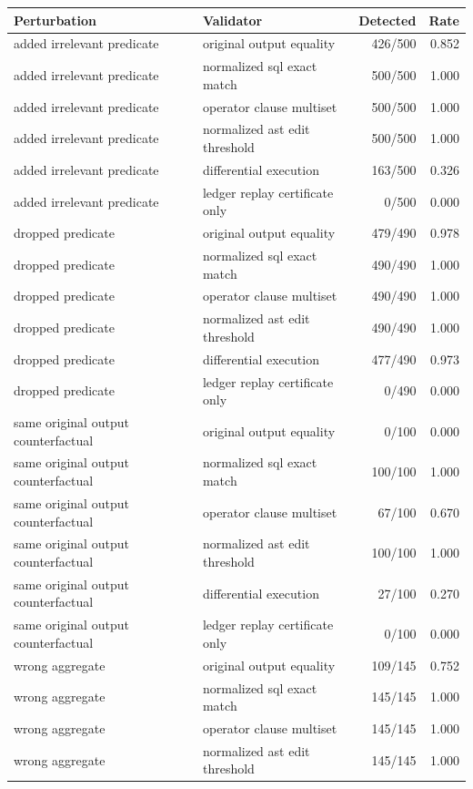 \begin{tabular}{llrr}
\toprule
Perturbation & Validator & Detected & Rate \\
\midrule
added irrelevant predicate & original output equality & 426/500 & 0.852 \\
added irrelevant predicate & normalized sql exact match & 500/500 & 1.000 \\
added irrelevant predicate & operator clause multiset & 500/500 & 1.000 \\
added irrelevant predicate & normalized ast edit threshold & 500/500 & 1.000 \\
added irrelevant predicate & differential execution & 163/500 & 0.326 \\
added irrelevant predicate & ledger replay certificate only & 0/500 & 0.000 \\
dropped predicate & original output equality & 479/490 & 0.978 \\
dropped predicate & normalized sql exact match & 490/490 & 1.000 \\
dropped predicate & operator clause multiset & 490/490 & 1.000 \\
dropped predicate & normalized ast edit threshold & 490/490 & 1.000 \\
dropped predicate & differential execution & 477/490 & 0.973 \\
dropped predicate & ledger replay certificate only & 0/490 & 0.000 \\
same original output counterfactual & original output equality & 0/100 & 0.000 \\
same original output counterfactual & normalized sql exact match & 100/100 & 1.000 \\
same original output counterfactual & operator clause multiset & 67/100 & 0.670 \\
same original output counterfactual & normalized ast edit threshold & 100/100 & 1.000 \\
same original output counterfactual & differential execution & 27/100 & 0.270 \\
same original output counterfactual & ledger replay certificate only & 0/100 & 0.000 \\
wrong aggregate & original output equality & 109/145 & 0.752 \\
wrong aggregate & normalized sql exact match & 145/145 & 1.000 \\
wrong aggregate & operator clause multiset & 145/145 & 1.000 \\
wrong aggregate & normalized ast edit threshold & 145/145 & 1.000 \\

\end{tabular}

